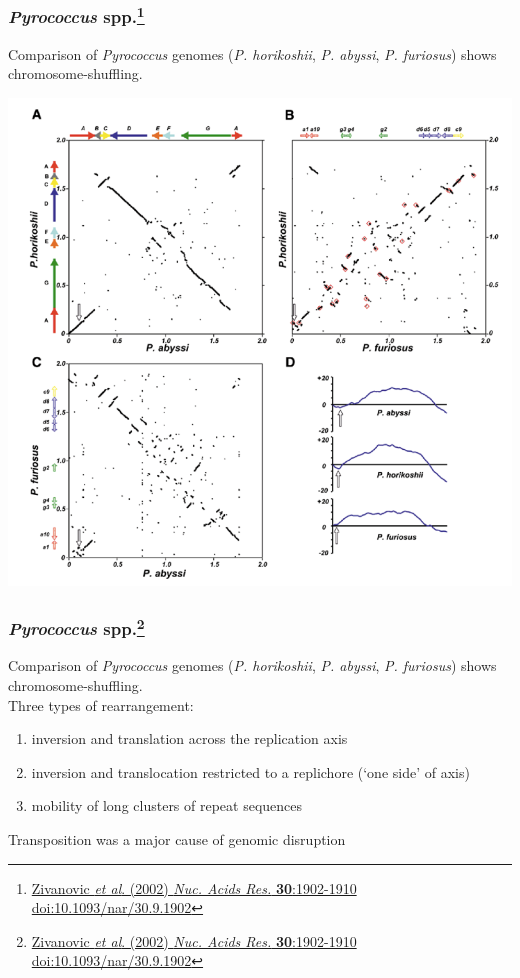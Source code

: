 \begin{frame}
  \frametitle{\textit{Pyrococcus} spp.\footnote{\tiny{\href{http://dx.doi.org/10.1093/nar/30.9.1902}{Zivanovic \textit{et al}. (2002) \textit{Nuc. Acids Res.} \textbf{30}:1902-1910 doi:10.1093/nar/30.9.1902}}}}
  Comparison of \textit{Pyrococcus} genomes (\textit{P. horikoshii}, \textit{P. abyssi}, \textit{P. furiosus}) shows chromosome-shuffling.\\
  \begin{center}
    \includegraphics[height=0.65\textheight]{images/pyrococcus}
  \end{center}    
\end{frame}

\begin{frame}
  \frametitle{\textit{Pyrococcus} spp.\footnote{\tiny{\href{http://dx.doi.org/10.1093/nar/30.9.1902}{Zivanovic \textit{et al}. (2002) \textit{Nuc. Acids Res.} \textbf{30}:1902-1910 doi:10.1093/nar/30.9.1902}}}}
  Comparison of \textit{Pyrococcus} genomes (\textit{P. horikoshii}, \textit{P. abyssi}, \textit{P. furiosus}) shows chromosome-shuffling.\\[0.2cm]
  Three types of rearrangement:
  \begin{enumerate}
    \item inversion and translation across the replication axis
    \item inversion and translocation restricted to a replichore (`one side' of axis)
    \item mobility of long clusters of repeat sequences
  \end{enumerate}  
  Transposition was a major cause of genomic disruption  
\end{frame}

